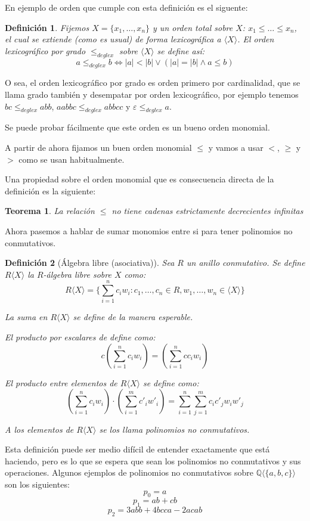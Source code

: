 \documentclass{report}
\theoremstyle{customstyle}
\newtheorem{definition}{Definición}[chapter]
\newtheorem{theorem}{Teorema}[chapter]
\theoremstyle{factstyle}
\begin{document}
En ejemplo de orden que cumple con esta definición es el siguente:

\begin{definition}
  Fijemos $X = \{x_1, …, x_n\}$ y un orden total sobre $X$: $x_1 ≤ … ≤ x_n$, el cual se extiende (como es usual) de forma lexicográfica a $⟨X⟩$. El orden lexicográfico por grado $ ≤_{deglex}$ sobre $⟨X⟩$ se define así:
  \[ a ≤_{deglex} b ⇔ |a| < |b| ∨ (|a| = |b| ∧ a ≤ b) \]
\end{definition}

O sea, el orden lexicográfico por grado es orden primero por cardinalidad, que se llama grado también y desempatar por orden lexicográfico, por ejemplo tenemos $bc ≤_{deglex} abb$, $aabbc ≤_{deglex} abbcc$ y $ε ≤_{deglex} a$.

Se puede probar fácilmente que este orden es un bueno orden monomial.

A partir de ahora fijamos un buen orden monomial $≤$ y vamos a usar $<$, $≥$ y $>$ como se usan habitualmente.

Una propiedad sobre el orden monomial que es consecuencia directa de la definición es la siguiente:

\begin{theorem}\label{thm:≤ no cadenas dec inf}
  La relación $≤$ no tiene cadenas estrictamente decrecientes infinitas
\end{theorem}

Ahora pasemos a hablar de sumar monomios entre si para tener polinomios no conmutativos.

\begin{definition}[Álgebra libre (asociativa)]
  Sea $R$ un anillo conmutativo. Se define $R⟨X⟩$ la $R$-álgebra libre sobre $X$ como:
  \[ R⟨X⟩ = \{∑_{i = 1}^n c_i w_i : c_1, …, c_n ∈ R, w_1, …, w_n ∈ ⟨X⟩\} \]

  La suma en $R⟨X⟩$ se define de la manera esperable.

  El producto por escalares de define como:
  \[ c (∑_{i = 1}^n c_i w_i) = (∑_{i = 1}^n c c_i w_i) \]

  El producto entre elementos de $R⟨X⟩$ se define como:
  \[ (∑_{i = 1}^n c_i w_i) · (∑_{i = 1}^m c'_i w'_i) = ∑_{i = 1}^n ∑_{j = 1}^m c_i c'_j w_i w'_j \]

  A los elementos de $R⟨X⟩$ se los llama polinomios no conmutativos.
\end{definition}

Esta definición puede ser medio difícil de entender exactamente que está haciendo, pero es lo que se espera que sean los polinomios no conmutativos y sus operaciones. Algunos ejemplos de polinomios no conmutativos sobre $ℚ⟨\{a, b, c\}⟩$ son los siguientes:
\[ p_0 = a \]
\[ p_1 = ab + cb \]
\[ p_2 = 3 abb + 4 bcca - 2 acab \]
\end{document}
